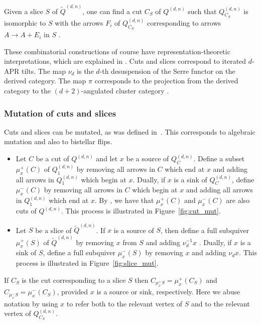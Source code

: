 \documentclass[ALCO,Unicode,published]{cedram}
\newcommand{\tqdn}{\tilde{Q}^{(d, n)}}
\newcommand{\qdn}{Q^{(d, n)}}
\begin{document}
Given a slice $S$ of $\tqdn$, one can find a cut $C_{S}$ of $\qdn$ such that $Q_{C_{S}}^{(d, n)}$ is isomorphic to $S$ with the arrows $F_{i}$ of $Q_{C_{S}}^{(d, n)}$ corresponding to arrows $A \to A + E_{i}$ in $S$ \cite[Theorem 5.24]{io}.

\begin{rema}
These combinatorial constructions of course have representation-theoretic interpretations, which are explained in \cite{io}. Cuts and slices correspond to iterated $d$-APR tilts. The map $\nu_{d}$ is the $d$-th desuspension of the Serre functor on the derived category. The map $\pi$ corresponds to the projection from the derived category to the $(d + 2)$-angulated cluster category \cite{ot}.
\end{rema}

\subsubsection{Mutation of cuts and slices}\label{sect:back:cut_slice:mut}

Cuts and slices can be mutated, as was defined in~\cite{io}. This corresponds to algebraic mutation and also to bistellar flips.
\begin{itemize}
\item Let $C$ be a cut of $\qdn$ and let $x$ be a source of $\qdn_{C}$. Define a subset $\mu_{x}^{+}(C)$ of $\qdn_{1}$ by removing all arrows in $C$ which end at $x$ and adding all arrows in $\qdn_{1}$ which begin at $x$. Dually, if $x$ is a sink of $\qdn_{C}$, define $\mu_{x}^{-}(C)$ by removing all arrows in $C$ which begin at $x$ and adding all arrows in $\qdn_{1}$ which end at $x$. By \cite[Proposition 5.14]{io}, we have that $\mu_{x}^{+}(C)$ and $\mu_{x}^{-}(C)$ are also cuts of $\qdn$. This process is illustrated in Figure~\ref{fig:cut_mut}.
\item Let $S$ be a slice of $\tqdn$. If $x$ is a source of $S$, then define a full subquiver $\mu_{x}^{+}(S)$ of $\tqdn$ by removing $x$ from $S$ and adding $\nu_{d}^{-1}x$ \cite[Definition 5.25]{io}. Dually, if $x$ is a sink of $S$, define a full subquiver $\mu_{x}^{-}(S)$ by removing $x$ and adding $\nu_{d}x$. This process is illustrated in Figure~\ref{fig:slice_mut}.
\end{itemize}
If $C_{S}$ is the cut corresponding to a slice $S$ then $C_{\mu_{x}^{+}{S}} = \mu_{x}^{+}(C_{S})$ and $C_{\mu_{x}^{-}{S}} = \mu_{x}^{-}(C_{S})$, provided $x$ is a source or sink, respectively. Here we abuse notation by using $x$ to refer both to the relevant vertex of $S$ and to the relevant vertex of $\qdn_{C_{S}}$.
\end{document}
